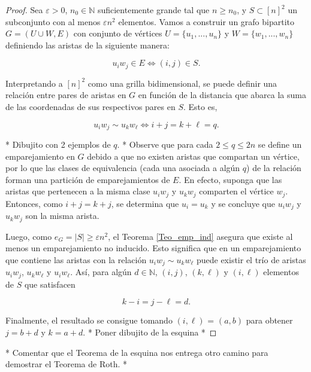 \documentclass{article}[14pts]
\newcommand{\fs}[1]{{\color{blue}* #1 *}}
\let\varepsilon=\varepsilon
\begin{document}
\begin{proof}
    Sea $\varepsilon > 0$, $n_0\in\mathbb{N}$ suficientemente grande tal que $n\geq n_0$, y $S\subset [n]^{2}$ un subconjunto con al menos $\varepsilon n^{2}$ elementos. Vamos a construir un grafo bipartito $G = (U\cup W, E)$ con conjunto de vértices $U = \lbrace u_1,...,u_n\rbrace$ y  $W = \lbrace w_1,...,w_n\rbrace$ definiendo las aristas de la siguiente manera:\medskip

    \[
        u_i w_j\in E \Longleftrightarrow (i,j)\in S.
    \]\medskip

    Interpretando a $[n]^{2}$ como una grilla bidimensional, se puede definir una relación entre pares de aristas en $G$ en función de la distancia que abarca la suma de las coordenadas de sus respectivos pares en $S$. Esto es,\medskip

    \[
        u_i w_j \sim u_k w_\ell \Longleftrightarrow i + j = k + \ell = q.
    \]\medskip

    \fs{Dibujito con 2 ejemplos de $q$.}
    Observe que para cada $2\leq q\leq 2n$ se define un emparejamiento en $G$ debido a que no existen aristas que compartan un vértice, por lo que las clases de equivalencia (cada una asociada a algún $q$) de la relación forman una partición de emparejamientos de $E$. En efecto, suponga que las aristas que pertenecen a la misma clase $u_i w_j$ y $u_k w_j$ comparten el vértice $w_j$. Entonces, como $i+j = k+j$, se determina que $u_i = u_k$ y se concluye que $u_i w_j$ y $u_k w_j$ son la misma arista.\medskip

    Luego, como $e_G = |S| \geq \varepsilon n^{2}$, el Teorema \ref{Teo_emp_ind} asegura que existe al menos un emparejamiento no inducido. Esto significa que en un emparejamiento que contiene las aristas con la relación $u_i w_j \sim u_k w_\ell$ puede existir el trío de aristas $u_i w_j$, $u_k w_\ell$ y $u_i w_\ell$. Así, para algún $d\in \mathbb{N}$, $(i,j)$, $(k,\ell)$ y $(i,\ell)$ elementos de $S$ que satisfacen\medskip

    \[
        k - i = j - \ell = d.
    \]\medskip

    Finalmente, el resultado se consigue tomando $(i,\ell)$ = $(a,b)$ para obtener $j = b + d$ y $k = a + d$. \fs{Poner dibujito de la esquina}
\end{proof}\medskip

\fs{Comentar que el Teorema de la esquina nos entrega otro camino para demostrar el Teorema de Roth.}\medskip
\end{document}
